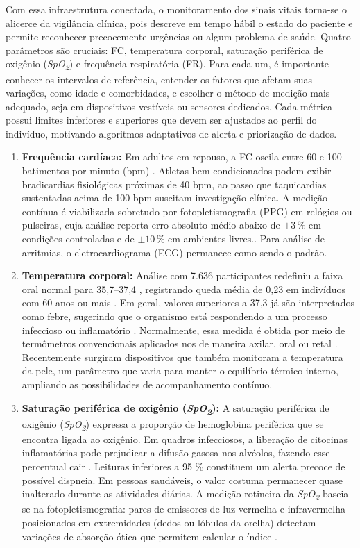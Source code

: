 \documentclass[twoside,english,brazilian]{UNISINOSmonografia}
\begin{document}
Com essa infraestrutura conectada, o monitoramento dos sinais vitais torna-se o alicerce da vigilância clínica, pois descreve em tempo hábil o estado do paciente e permite reconhecer precocemente urgências ou algum problema de saúde. Quatro parâmetros são cruciais: FC, temperatura corporal, saturação periférica de oxigênio (\textit{SpO\textsubscript{2}}) e frequência respiratória (FR). Para cada um, é importante conhecer os intervalos de referência, entender os fatores que afetam suas variações, como idade e comorbidades, e escolher o método de medição mais adequado, seja em dispositivos vestíveis ou sensores dedicados. Cada métrica possui limites inferiores e superiores que devem ser ajustados ao perfil do indivíduo, motivando algoritmos adaptativos de alerta e priorização de dados.

\begin{enumerate}
  \item \textbf{Frequência cardíaca:} Em adultos em repouso, a FC oscila entre 60 e 100 batimentos por minuto (bpm) \cite{AHA2024}. Atletas bem condicionados podem exibir bradicardias fisiológicas próximas de 40 bpm, ao passo que taquicardias sustentadas acima de 100 bpm suscitam investigação clínica. A medição contínua é viabilizada sobretudo por fotopletismografia (PPG) em relógios ou pulseiras, cuja análise reporta erro absoluto médio abaixo de $\pm 3\,\%$ em condições controladas e de $\pm 10\,\%$ em ambientes livres.\cite{KIM2023}. Para análise de arritmias, o eletrocardiograma (ECG) permanece como sendo o padrão.

  \item \textbf{Temperatura corporal:} Análise com 7.636 participantes redefiniu a faixa oral normal para 35,7–37,4 \textdegree, registrando queda média de 0,23 \textdegree em indivíduos com 60 anos ou mais \cite{Geneva2019}. Em geral, valores superiores a 37,3 \textdegree já são interpretados como febre, sugerindo que o organismo está respondendo a um processo infeccioso ou inflamatório \cite{Zhang2021}. Normalmente, essa medida é obtida por meio de termômetros convencionais aplicados nos de maneira axilar, oral ou retal \cite{Kanegaye2016}. Recentemente surgiram dispositivos que também monitoram a temperatura da pele, um parâmetro que varia para manter o equilíbrio térmico interno, ampliando as possibilidades de acompanhamento contínuo.

  \item \textbf{Saturação periférica de oxigênio (\textit{SpO\textsubscript{2}}):} A saturação periférica de oxigênio (\textit{SpO\textsubscript{2}}) expressa a proporção de hemoglobina periférica que se encontra ligada ao oxigênio. Em quadros infecciosos, a liberação de citocinas inflamatórias pode prejudicar a difusão gasosa nos alvéolos, fazendo esse percentual cair \cite{Meleveedu2020}. Leituras inferiores a 95 \% constituem um alerta precoce de  possível dispneia. Em pessoas saudáveis, o valor costuma permanecer quase inalterado durante as atividades diárias. A medição rotineira da \textit{SpO\textsubscript{2}} baseia-se na fotopletismografia: pares de emissores de luz vermelha e infravermelha posicionados em extremidades (dedos ou lóbulos da orelha) detectam variações de absorção ótica que permitem calcular o índice \cite{KumarV2021}.


\end{enumerate}
\end{document}
